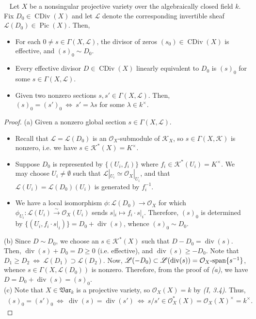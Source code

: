 \documentclass[11pt,a4paper,footinclude=true,headinclude=true]{scrbook} %
\DeclareMathOperator{\CDiv}{CDiv}
\DeclareMathOperator{\Pic}{Pic}
\DeclareMathOperator{\dv}{div}
\newcommand{\KK}{\mathscr{K}}
\newcommand{\LL}{\mathscr{L}}
\newcommand{\OO}{\mathcal{O}}
\newcommand{\Var}{\mathfrak{Var}}
\newcommand{\<}{\langle}
\newcommand{\>}{\rangle}
\newcommand{\isoto}{\overset{\sim}{\to}}
\newcommand{\spn}{\mathchar`-\mathrm{span}}
\newenvironment{proposition}[2][]
{\renewcommand\theinnercustomprop{#2}\innercustomprop[#1] 
\begin{mdframed}[backgroundcolor=gray!20]\ }
{\end{mdframed}\endinnercustomprop}
\begin{document}
\begin{proposition}{7.7}
    Let $X$ be a nonsingular projective variety over the algebraically closed field $k$.\\ Fix $D_0\in\CDiv(X)$ and let $\LL$ denote the corresponding invertible sheaf $\LL(D_0)\in\Pic(X)$. Then,
    \begin{itemize}
        \item[(a)] For each $0\neq s\in\Gamma(X,\LL)$, the divisor of zeros $(s_0)\in\CDiv(X)$ is effective, and $(s)_0\sim D_0$.
        \item[(b)] Every effective divisor $D\in\CDiv(X)$ linearly equivalent to $D_0$ is $(s)_0$ for some $s\in\Gamma(X,\LL)$.
        \item[(c)] Given two nonzero sections $s,s'\in\Gamma(X,\LL)$. Then, $(s)_0=(s')_0\ \Longleftrightarrow\ s'=\lambda s$ for some $\lambda\in k^\times$.
    \end{itemize}
\end{proposition}
\begin{proof}
    (a) Given a nonzero global section $s\in\Gamma(X,\LL)$.
    \begin{itemize}
        \item Recall that $\LL=\LL(D_0)$ is an $\OO_X$-submodule of $\KK_X$, so $s\in\Gamma(X,\KK)$ is nonzero, i.e. we have  $s\in\KK^\ast(X)=K^\times$.
        \item Suppose $D_0$ is represented by $\{(U_i,f_i)\}$ where $f_i\in\KK^\ast(U_i)=K^\times$. We may choose $U_i\neq\emptyset$ such that $\LL|_{U_i}\simeq\OO_X|_{U_i}$, and that $\LL(U_i)=\LL(D_0)(U_i)$ is generated by $f_i^{-1}$.
        \item We have a local isomorphism $\phi:\LL(D_0)\to\OO_X$ for which $\phi_{U_i}:\LL(U_i)\isoto\OO_X(U_i)$ sends $s|_i\mapsto f_i\cdot s|_i$. Therefore, $(s)_0$ is determined by $\{(U_i,f_i\cdot s|_i)\}=D_0+\dv(s)$, whence $(s)_0\sim D_0$.
    \end{itemize}
    
    (b) Since $D\sim D_0$, we choose an $s\in\KK^\ast(X)$ such that $D-D_0=\dv(s)$. Then, $\dv(s)+D_0=D\geq0$ (i.e. effective), and $\dv(s)\geq-D_0$. Note that $D_1\geq D_2\ \Longleftrightarrow\ \LL(D_1)\supset\LL(D_2)$. Now, $\LL(-D_0)\subset\LL(\dv(s))=\OO_X\spn\{s^{-1}\}$, whence $s\in\Gamma(X,\LL(D_0))$ is nonzero. Therefore, from the proof of \textit{(a)}, we have $D=D_0+\dv(s)=(s)_0$.\\
    
    (c) Note that $X\in\Var_k$ is a projective variety, so $\OO_X(X)=k$ by \textit{(I, 3.4)}. Thus, 
    \begin{align*}
        (s)_0=(s')_0\ \Longleftrightarrow\ \dv(s)=\dv(s')\ \Longleftrightarrow\ s/s'\in\OO_X^\ast(X)=\OO_X(X)^\times=k^\times.
    \end{align*}
\end{proof}
\end{document}
